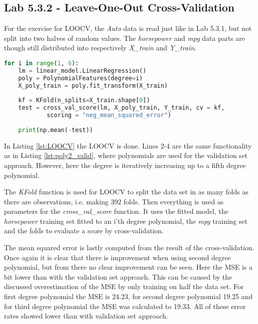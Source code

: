 
\subsection{Lab 5.3.2 - Leave-One-Out Cross-Validation}
For the exercise for LOOCV, the \emph{Auto} data is read just like in Lab 5.3.1, but not split into two halves of random values. The \emph{horsepower} and \emph{mpg} data parts are though still distributed into respectively \emph{X\_train} and \emph{Y\_train}. 

\begin{lstlisting}[language=Python, label=lst:LOOCV, caption=Leave-one-out cross-validation loop]
for i in range(1, 6):
	lm = linear_model.LinearRegression()
	poly = PolynomialFeatures(degree=i)
	X_poly_train = poly.fit_transform(X_train)
	
	kf = KFold(n_splits=X_train.shape[0]) 
	test = cross_val_score(lm, X_poly_train, Y_train, cv = kf, 
			scoring = "neg_mean_squared_error")
	
	print(np.mean(-test))
\end{lstlisting}

In Listing \ref{lst:LOOCV} the LOOCV is done. Lines 2-4 are the same functionality as in Listing \ref{lst:poly2_valid}, where polynomials are used for the validation set approach. However, here the degree is iteratively increasing up to a fifth degree polynomial.

The \emph{KFold} function is used for LOOCV to split the data set in as many folds as there are observations, i.e. making 392 folds. Then everything is used as parameters for the \emph{cross\_val\_score} function. It uses the fitted model, the \emph{horsepower} training set fitted to an i'th degree polynomial, the \emph{mpg} training set and the folds to evaluate a score by cross-validation.

The mean squared error is lastly computed from the result of the cross-validation. Once again it is clear that there is improvement when using second degree polynomial, but from there no clear improvement can be seen. Here the MSE is a bit lower than with the validation set approach. This can be caused by the discussed overestimation of the MSE by only training on half the  data set. For first degree polynomial the MSE is 24.23, for second degree polynomial 19.25 and for third degree polynomial the MSE was calculated to 19.33. All of these error rates showed lower than with validation set approach.


